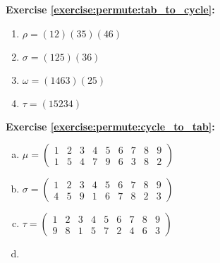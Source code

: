 \noindent\textbf{Exercise \ref{exercise:permute:tab_to_cycle}:} %
\begin{multicols}{2}
\begin{enumerate}[{a.}]
 
\item
$\rho = (12)(35)(46)$

\item
$\sigma = (125)(36)$

\item
$\omega = (1463)(25)$

\item
$\tau = (15234)$
\end{enumerate}
\end{multicols}

\noindent\textbf{Exercise \ref{exercise:permute:cycle_to_tab}:} %
\begin{enumerate}[(a)]
\item
$\mu = \begin{pmatrix}
1 & 2 & 3 & 4 & 5 & 6 & 7 & 8 & 9\\
1 & 5 & 4 & 7 & 9 & 6 & 3 & 8 & 2
\end{pmatrix}$

\item
$\sigma = \begin{pmatrix}
1 & 2 & 3 & 4 & 5 & 6 & 7 & 8 & 9\\
4 & 5 & 9 & 1 & 6 & 7 & 8 & 2 & 3
\end{pmatrix}$

\item
$\tau= \begin{pmatrix} 
1 & 2 & 3 & 4 & 5 & 6 & 7 & 8 & 9\\
9 & 8 & 1 & 5 & 7 & 2 & 4 & 6 & 3
\end{pmatrix}$

\item
\end{enumerate}

